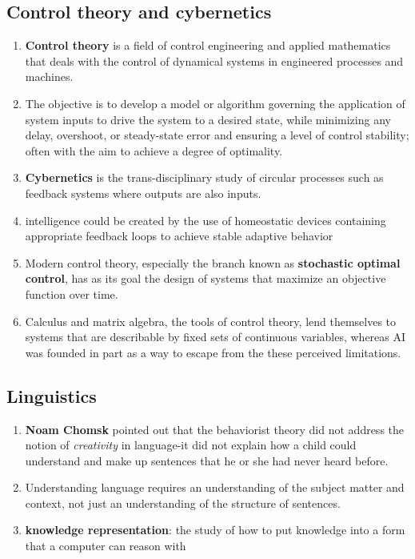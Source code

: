\subsection{Control theory and cybernetics}
\begin{enumerate}
    \item \textbf{Control theory} is a field of control engineering and applied mathematics that deals with the control of dynamical systems in engineered processes and machines. \cite{wiki/Control_theory}
    
    \item The objective is to develop a model or algorithm governing the application of system inputs to drive the system to a desired state, while minimizing any delay, overshoot, or steady-state error and ensuring a level of control stability; often with the aim to achieve a degree of optimality. \cite{wiki/Control_theory}

    \item \textbf{Cybernetics} is the trans-disciplinary study of circular processes such as feedback systems where outputs are also inputs. \cite{wiki/Cybernetics}

    \item intelligence could be created by the use of homeostatic devices containing appropriate feedback loops to achieve stable adaptive behavior

    \item Modern control theory, especially the branch known as \textbf{stochastic optimal control}, has as its goal the design of systems that maximize an objective function over time.

    \item Calculus and matrix algebra, the tools of control theory, lend themselves to systems that are describable by fixed sets of continuous variables, whereas AI was founded in part as a way to escape from the these perceived limitations. 
\end{enumerate}

\subsection{Linguistics}
\begin{enumerate}
    \item \textbf{Noam Chomsk} pointed out that the behaviorist theory did not address the notion of \textit{creativity} in language-it did not explain how a child could understand and make up sentences that he or she had never heard before. 

    \item Understanding language requires an understanding of the subject matter and context, not just an understanding of the structure of sentences.

    \item \textbf{knowledge representation}: the study of how to put knowledge into a form that a computer can reason with
\end{enumerate}



